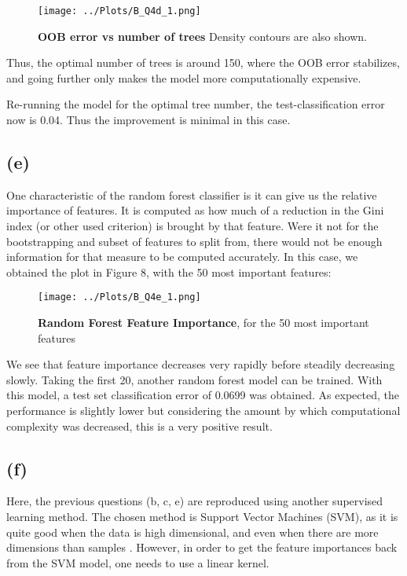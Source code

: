 \documentclass[12pt]{report} %
\begin{document}
\begin{figure}[htbp]
    \centering
    \texttt{[image: ../Plots/B\_Q4d\_1.png]}
    \caption{\textbf{OOB error vs number of trees} Density contours are also shown.}
\end{figure}

Thus, the optimal number of trees is around 150, where the OOB error stabilizes, and going further only makes the model more computationally expensive.

Re-running the model for the optimal tree number, the test-classification error now is 0.04. Thus the improvement is minimal in this case.


\subsection*{(e)}

One characteristic of the random forest classifier is it can give us the relative importance of features. It is computed as how much of a reduction in the Gini index (or other used criterion) is brought by that feature. Were it not for the bootstrapping and subset of features to split from, there would not be enough information for that measure to be computed accurately\cite[pp. 345-346]{james2013introduction}. In this case, we obtained the plot in Figure 8, with the 50 most important features:

\begin{figure}[htbp]
    \centering
    \texttt{[image: ../Plots/B\_Q4e\_1.png]}
    \caption{\textbf{Random Forest Feature Importance}, for the 50 most important features}
\end{figure}

We see that feature importance decreases very rapidly before steadily decreasing slowly. Taking the first 20, another random forest model can be trained. With this model, a test set classification error of 0.0699 was obtained. As expected, the performance is slightly lower but considering the amount by which computational complexity was decreased, this is a very positive result.


\subsection*{(f)}

Here, the previous questions (b, c, e) are reproduced using another supervised learning method. The chosen method is Support Vector Machines (SVM), as it is quite good when the data is high dimensional, and even when there are more dimensions than samples \cite{svm_sklearn}. However, in order to get the feature importances back from the SVM model, one needs to use a linear kernel. 
\end{document}
